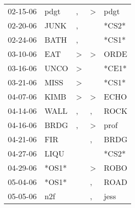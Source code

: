\begin{supertabular}{p{0.07\textwidth}p{0.06\textwidth}p{0.02\textwidth}p{0.02\textwidth}p{0.06\textwidth}}
          02-15-06\textsuperscript{} &           pdgt\textsuperscript{} &                , &     \textgreater &           pdgt\textsuperscript{} \\
          02-20-06\textsuperscript{} &           JUNK\textsuperscript{} &                , &                  &                            *CS2* \\
          02-24-06\textsuperscript{} &           BATH\textsuperscript{} &                , &                  &                            *CS1* \\
          03-10-06\textsuperscript{} &            EAT\textsuperscript{} &     \textgreater &     \textgreater &           ORDE\textsuperscript{} \\
          03-16-06\textsuperscript{} &           UNCO\textsuperscript{} &     \textgreater &                  &                            *CE1* \\
          03-21-06\textsuperscript{} &           MISS\textsuperscript{} &     \textgreater &                  &                            *CS1* \\
          04-07-06\textsuperscript{} &           KIMB\textsuperscript{} &     \textgreater &     \textgreater &           ECHO\textsuperscript{} \\
          04-14-06\textsuperscript{} &           WALL\textsuperscript{} &                , &                , &           ROCK\textsuperscript{} \\
          04-16-06\textsuperscript{} &           BRDG\textsuperscript{} &                , &     \textgreater &           prof\textsuperscript{} \\
          04-21-06\textsuperscript{} &            FIR\textsuperscript{} &                  &                , &           BRDG\textsuperscript{} \\
          04-27-06\textsuperscript{} &           LIQU\textsuperscript{} &                  &                  &                            *CS2* \\
          04-29-06\textsuperscript{} &                            *OS1* &                  &     \textgreater &           ROBO\textsuperscript{} \\
          05-04-06\textsuperscript{} &                            *OS1* &                  &                , &           ROAD\textsuperscript{} \\
          05-05-06\textsuperscript{} &            n2f\textsuperscript{} &                  &                , &           jess\textsuperscript{} \\

\end{supertabular}
